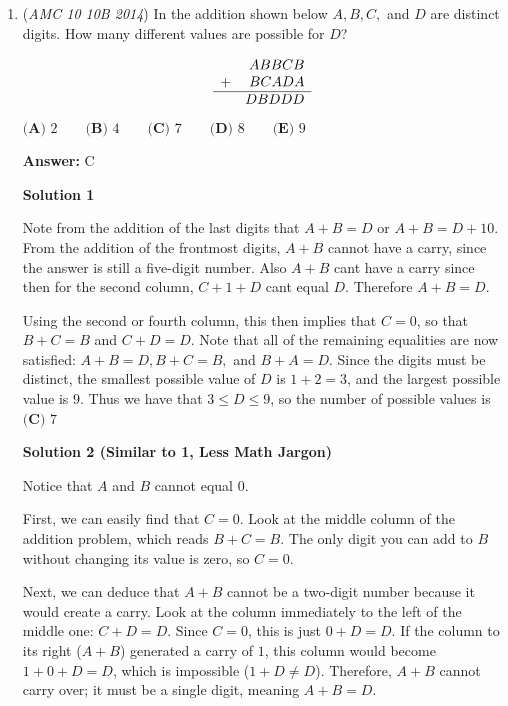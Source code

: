 \begin{enumerate}
 Therefore, the answers to the equations are the negatives of each other. Thus the answer is $\boxed{(A)}$



	\item (\textit{AMC 10 10B 2014}) In the addition shown below $A, B, C,$ and $D$ are distinct digits. How many different values are possible for $D$?


 
 \[\begin{array}{lr}&ABBCB\\ +& BCADA\\ \hline & DBDDD\end{array}\]
$\textbf{(A) }2\qquad\textbf{(B) }4\qquad\textbf{(C) }7\qquad\textbf{(D) }8\qquad\textbf{(E) }9$

 \textbf{Answer: }C



\textbf{Solution 1}

Note from the addition of the last digits that $A+B=D\text{ or }A+B=D+10$. From the addition of the frontmost digits, $A+B$ cannot have a carry, since the answer is still a five-digit number. Also $A + B$ cant have a carry since then for the second column, $C + 1 + D$ cant equal $D$. Therefore $A+B=D$. 

 Using the second or fourth column, this then implies that $C=0$, so that $B+C=B$ and $C+D=D$. Note that all of the remaining equalities are now satisfied: $A+B=D, B+C=B,$ and $B+A=D$. Since the digits must be distinct, the smallest possible value of $D$ is $1+2=3$, and the largest possible value is $9$. Thus we have that $3\le D\le9$, so the number of possible values is $\boxed{\textbf{(C) }7}$




\textbf{Solution 2 (Similar to 1, Less Math Jargon)}

Notice that $A$ and $B$ cannot equal $0$. 

 First, we can easily find that $C = 0$. Look at the middle column of the addition problem, which reads $B + C = B$. The only digit you can add to $B$ without changing its value is zero, so $C = 0$.

 Next, we can deduce that $A+B$ cannot be a two-digit number because it would create a carry. Look at the column immediately to the left of the middle one: $C + D = D$. Since $C = 0$, this is just $0 + D = D$. If the column to its right ($A + B$) generated a carry of $1$, this column would become $1 + 0 + D = D$, which is impossible ($1 + D \neq D$). Therefore, $A + B$ cannot carry over; it must be a single digit, meaning $A + B = D$.


\end{enumerate}

